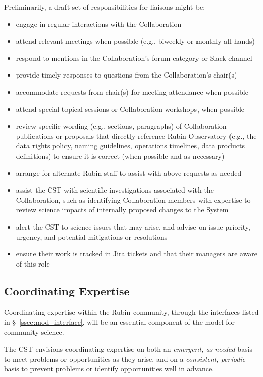 \documentclass[DM,authoryear,toc]{lsstdoc}
\begin{document}
Preliminarily, a draft set of responsibilities for liaisons might be:
\begin{itemize}
\item engage in regular interactions with the Collaboration
\item attend relevant meetings when possible (e.g., biweekly or monthly all-hands)
\item respond to mentions in the Collaboration's forum category or Slack channel
\item provide timely responses to questions from the Collaboration's chair(s)
\item accommodate requests from chair(s) for meeting attendance when possible
\item attend special topical sessions or Collaboration workshops, when possible
\item review specific wording (e.g., sections, paragraphs) of Collaboration publications or proposals that directly reference Rubin Observatory (e.g., the data rights policy, naming guidelines, operations timelines, data products definitions) to ensure it is correct (when possible and as necessary)
\item arrange for alternate Rubin staff to assist with above requests as needed
\item assist the CST with scientific investigations associated with the Collaboration, such as identifying Collaboration members with expertise to review science impacts of internally proposed changes to the System
\item alert the CST to science issues that may arise, and advise on issue priority, urgency, and potential mitigations or resolutions
\item ensure their work is tracked in Jira tickets and that their managers are aware of this role
\end{itemize}



\subsection{Coordinating Expertise}\label{ssec:mod_coord}

Coordinating expertise within the Rubin community, through the interfaces listed in \S~\ref{ssec:mod_interface}, will be an essential component of the model for community science.

The CST envisions coordinating expertise on both an \textit{emergent, as-needed} basis to meet problems or opportunities as they arise, and on a \textit{consistent, periodic} basis to prevent problems or identify opportunities well in advance.
\end{document}
